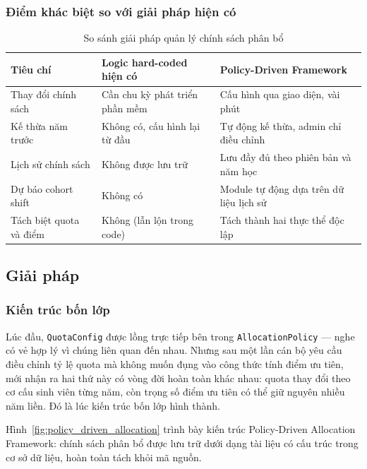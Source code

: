\documentclass[../DoAn.tex]{subfiles}
\begin{document}
\subsubsection{Điểm khác biệt so với giải pháp hiện có}

\begin{table}[H]
\centering
\caption{So sánh giải pháp quản lý chính sách phân bổ}
\label{tab:policy_comparison}
\small
\begin{tabular}{|p{3.5cm}|p{4.5cm}|p{4.8cm}|}
\hline
\textbf{Tiêu chí} & \textbf{Logic hard-coded hiện có} & \textbf{Policy-Driven Framework} \\
\hline
Thay đổi chính sách & Cần chu kỳ phát triển phần mềm & Cấu hình qua giao diện, vài phút \\
\hline
Kế thừa năm trước & Không có, cấu hình lại từ đầu & Tự động kế thừa, admin chỉ điều chỉnh \\
\hline
Lịch sử chính sách & Không được lưu trữ & Lưu đầy đủ theo phiên bản và năm học \\
\hline
Dự báo cohort shift & Không có & Module tự động dựa trên dữ liệu lịch sử \\
\hline
Tách biệt quota và điểm & Không (lẫn lộn trong code) & Tách thành hai thực thể độc lập \\
\hline
\end{tabular}
\end{table}

\subsection{Giải pháp}
\label{subsec:policy_arch}

\subsubsection{Kiến trúc bốn lớp}

Lúc đầu, \texttt{QuotaConfig} được lồng trực tiếp bên trong
\texttt{AllocationPolicy} --- nghe có vẻ hợp lý vì chúng liên quan đến nhau.
Nhưng sau một lần cán bộ yêu cầu điều chỉnh tỷ lệ quota mà không muốn đụng
vào công thức tính điểm ưu tiên, mới nhận ra hai thứ này có vòng đời hoàn
toàn khác nhau: quota thay đổi theo cơ cấu sinh viên từng năm, còn trọng số
điểm ưu tiên có thể giữ nguyên nhiều năm liền. Đó là lúc kiến trúc bốn lớp
hình thành.

Hình~\ref{fig:policy_driven_allocation} trình bày kiến trúc Policy-Driven
Allocation Framework: chính sách phân bổ được lưu trữ dưới dạng tài liệu có
cấu trúc trong cơ sở dữ liệu, hoàn toàn tách khỏi mã nguồn.
\end{document}
